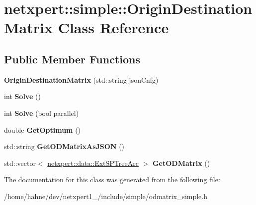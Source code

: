 \hypertarget{classnetxpert_1_1simple_1_1OriginDestinationMatrix}{}\section{netxpert\+:\+:simple\+:\+:Origin\+Destination\+Matrix Class Reference}
\label{classnetxpert_1_1simple_1_1OriginDestinationMatrix}
\subsection*{Public Member Functions}
\begin{DoxyCompactItemize}
\item 
{\bfseries Origin\+Destination\+Matrix} (std\+::string json\+Cnfg)\hypertarget{classnetxpert_1_1simple_1_1OriginDestinationMatrix_af8c50cacd33cc7e744eba19b236bf0d0}{}\label{classnetxpert_1_1simple_1_1OriginDestinationMatrix_af8c50cacd33cc7e744eba19b236bf0d0}

\item 
int {\bfseries Solve} ()\hypertarget{classnetxpert_1_1simple_1_1OriginDestinationMatrix_a0ae3ad35c6c2ce358634c931f1cd6c7b}{}\label{classnetxpert_1_1simple_1_1OriginDestinationMatrix_a0ae3ad35c6c2ce358634c931f1cd6c7b}

\item 
int {\bfseries Solve} (bool parallel)\hypertarget{classnetxpert_1_1simple_1_1OriginDestinationMatrix_ac746559fd6d2543df7cf0204556413c8}{}\label{classnetxpert_1_1simple_1_1OriginDestinationMatrix_ac746559fd6d2543df7cf0204556413c8}

\item 
double {\bfseries Get\+Optimum} ()\hypertarget{classnetxpert_1_1simple_1_1OriginDestinationMatrix_aa5cfa1d67d46d0f316a3372cee884023}{}\label{classnetxpert_1_1simple_1_1OriginDestinationMatrix_aa5cfa1d67d46d0f316a3372cee884023}

\item 
std\+::string {\bfseries Get\+O\+D\+Matrix\+As\+J\+S\+ON} ()\hypertarget{classnetxpert_1_1simple_1_1OriginDestinationMatrix_a553d23d199377b96c16d21d286809cd8}{}\label{classnetxpert_1_1simple_1_1OriginDestinationMatrix_a553d23d199377b96c16d21d286809cd8}

\item 
std\+::vector$<$ \hyperlink{structnetxpert_1_1data_1_1ExtSPTreeArc}{netxpert\+::data\+::\+Ext\+S\+P\+Tree\+Arc} $>$ {\bfseries Get\+O\+D\+Matrix} ()\hypertarget{classnetxpert_1_1simple_1_1OriginDestinationMatrix_adca164a4061f90ba3d534ae0fda98afb}{}\label{classnetxpert_1_1simple_1_1OriginDestinationMatrix_adca164a4061f90ba3d534ae0fda98afb}

\end{DoxyCompactItemize}


The documentation for this class was generated from the following file\+:\begin{DoxyCompactItemize}
\item 
/home/hahne/dev/netxpert1\+\_/include/simple/odmatrix\+\_\+simple.\+h\end{DoxyCompactItemize}
